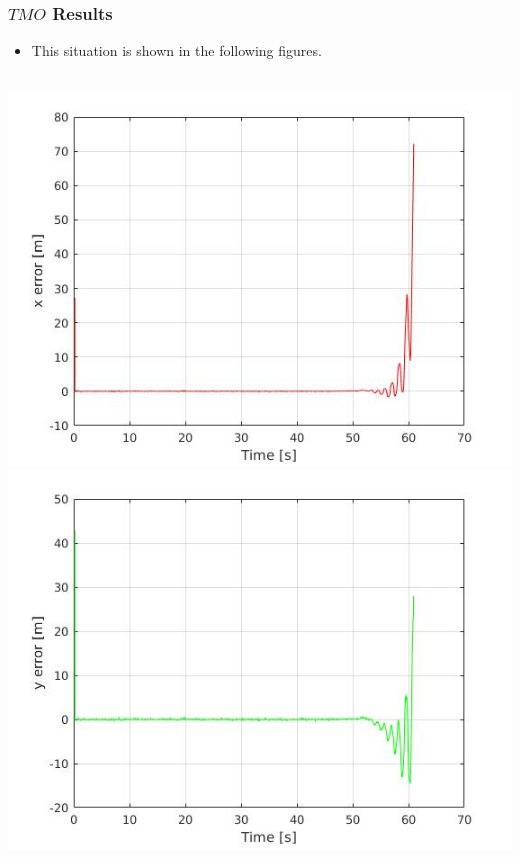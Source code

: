 \documentclass{beamer}
\begin{document}
   \begin{frame}
		\frametitle{$TMO$ Results}
		\begin{itemize}
		    \item This situation is shown in the following figures.
	    \end{itemize}
		\begin{columns}[t]
			\centering
			\includegraphics[scale=0.2]{x_div}\\
			\includegraphics[scale=0.2]{y_div}
			\centering

\end{columns}
\end{frame}
\end{document}
